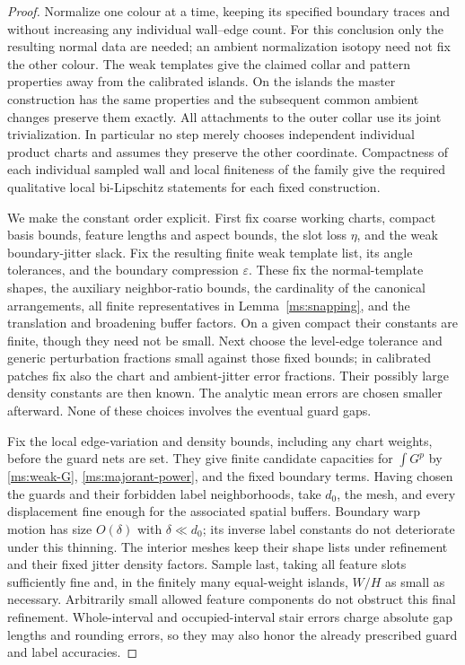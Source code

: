 \begin{proof}
Normalize one colour at a time, keeping its specified boundary
traces and without increasing any individual wall--edge count.  For this
conclusion only the resulting normal data
are needed; an ambient normalization isotopy need not fix the
other colour.  The weak templates give the claimed collar and
pattern properties away from the calibrated islands.  On the
islands the master construction has the same properties and
the subsequent common ambient changes preserve them exactly.
All attachments to the outer collar use its joint trivialization.
In particular no step merely chooses independent individual
product charts and assumes they preserve the other coordinate.
Compactness of each individual sampled wall and local
finiteness of the family give the required qualitative local
bi-Lipschitz statements for each fixed construction.

We make the constant order explicit.  First fix coarse working
charts, compact basis bounds, feature lengths and aspect bounds,
the slot loss $\eta$, and the weak boundary-jitter slack.  Fix
the resulting finite weak template list, its angle tolerances,
and the boundary compression $\varepsilon$.  These fix the
normal-template shapes, the auxiliary neighbor-ratio bounds,
the cardinality of the canonical arrangements, all finite
representatives in Lemma~\ref{ms:snapping}, and the translation and
broadening buffer factors.  On a given compact their constants
are finite, though they need not be small.  Next choose the
level-edge tolerance and generic perturbation fractions small
against those fixed bounds; in calibrated patches fix also the
chart and ambient-jitter error fractions.  Their possibly large
density constants are then known.  The analytic mean errors
are chosen smaller afterward.  None of these choices involves
the eventual guard gaps.

Fix the local edge-variation and density bounds, including any
chart weights, before the guard nets are set.  They give finite
candidate capacities for $\int G^p$ by
\eqref{ms:weak-G}, \eqref{ms:majorant-power}, and the fixed
boundary terms.  Having chosen the guards and their forbidden
label neighborhoods, take $d_0$, the mesh, and every displacement
fine enough for the associated spatial buffers.  Boundary warp
motion has size $O(\delta)$ with $\delta\ll d_0$; its inverse
label constants do not deteriorate under this thinning.  The
interior meshes keep their shape lists under refinement and
their fixed jitter density factors.  Sample last, taking all
feature slots sufficiently fine and, in the finitely many
equal-weight islands, $W/H$ as small as necessary.  Arbitrarily
small allowed feature components do not obstruct this final
refinement.  Whole-interval and occupied-interval stair errors
charge absolute gap lengths and rounding errors, so they may
also honor the already prescribed guard and label accuracies.


\end{proof}
